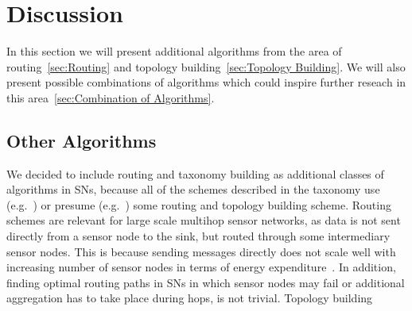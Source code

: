 
\section{Discussion}
\label{sec:Discussion}

In this section we will present additional algorithms from the area of
routing~\ref{sec:Routing} and topology building~\ref{sec:Topology Building}. We
will also present possible combinations of algorithms which could inspire
further reseach in this area~\ref{sec:Combination of Algorithms}.

\subsection{Other Algorithms}
\label{sec:Other Algorithms}

We decided to include routing and taxonomy building as additional classes of
algorithms in \acp{SN}, because all of the schemes described in the taxonomy
use (e.g.~\cite{padhy2006utility}) or presume
(e.g.~\cite{silberstein2006constraint}) some routing and topology building
scheme. Routing schemes are relevant for large scale multihop sensor networks,
as data is not sent directly from a sensor node to the sink, but routed through
some intermediary sensor nodes. This is because sending messages directly does
not scale well with increasing number of sensor nodes in terms of energy
expenditure~\cite{padhy2006utility}. In addition, finding optimal routing paths
in \acp{SN} in which sensor nodes may fail or additional aggregation has to
take place during hops, is not trivial. Topology building 


